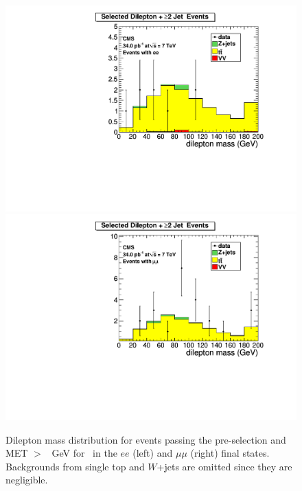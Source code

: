 \begin{figure}[hbt]
\begin{center}
\includegraphics[width=0.48\linewidth]{plots/hdilmass_pfmet60_ee_allj.pdf}
\includegraphics[width=0.48\linewidth]{plots/hdilmass_pfmet60_mm_allj.pdf}
\caption{\label{fig:dilmass60}\protect Dilepton mass distribution for events passing the pre-selection 
  and MET $>$ \signalmetl~GeV for \lumi\ in the $ee$ (left) and $\mu\mu$ (right) final states. Backgrounds from single top 
  and $W$+jets are omitted since they are negligible.}
\end{center}
\end{figure}

